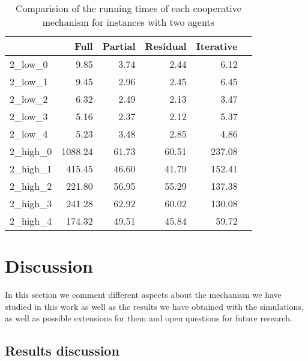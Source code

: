\documentclass[authoryear]{elsarticle}
\begin{document}
\begin{table}[h!]
\centering
\caption{Comparision of the running times of each cooperative mechanism for instances with two agents\label{tb:2_times}}
\begin{tabular}{lrrrrr}
\toprule
{} &     Full &  Partial &  Residual &  Iterative \\
\midrule
2\_low\_0  &               9.85 &     3.74 &      2.44 &       6.12 \\
2\_low\_1  &                 9.45 &     2.96 &      2.45 &       6.45 \\
2\_low\_2  &                6.32 &     2.49 &      2.13 &       3.47 \\
2\_low\_3  &                 5.16 &     2.37 &      2.12 &       5.37 \\
2\_low\_4  &                 5.23 &     3.48 &      2.85 &       4.86 \\
2\_high\_0 &             1088.24 &    61.73 &     60.51 &     237.08 \\
2\_high\_1 &              415.45 &    46.60 &     41.79 &     152.41 \\
2\_high\_2 &              221.80 &    56.95 &     55.29 &     137.38 \\
2\_high\_3 &              241.28 &    62.92 &     60.02 &     130.08 \\
2\_high\_4 &              174.32 &    49.51 &     45.84 &      59.72 \\
\bottomrule
\end{tabular}
\end{table}





\section{Discussion} \label{seq:discussion}

In this section we comment different aspects about the mechanism we have studied in this work as well as the results we have obtained with the simulations, as well as possible extensions for them and open questions for future research.

\subsection{Results discussion}
\end{document}
